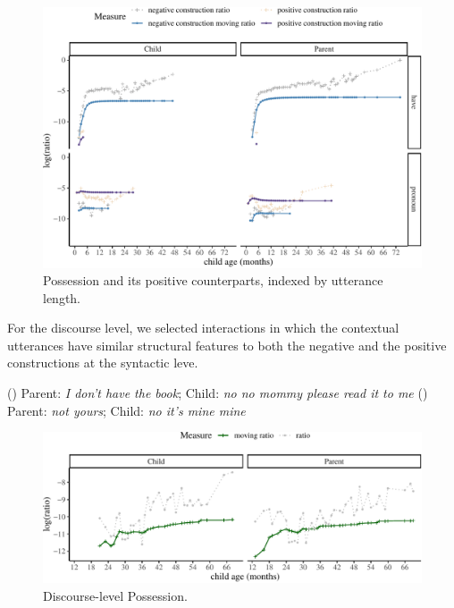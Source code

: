 \documentclass[
  english,
  man,floatsintext]{apa6}
\begin{document}
\begin{figure}[H]

{\centering \includegraphics{neg_construction_article_files/figure-latex/possessionul-1} 

}

\caption{Possession and its positive counterparts, indexed by utterance length.}\label{fig:possessionul}
\end{figure}

For the discourse level, we selected interactions in which the contextual utterances have similar structural features to both the negative and the positive constructions at the syntactic leve.

() Parent: \emph{I don't have the book}; Child: \emph{no no mommy please read it to me}
() Parent: \emph{not yours}; Child: \emph{no it's mine mine}

\begin{figure}[H]

{\centering \includegraphics{neg_construction_article_files/figure-latex/possessiondiscourse-1} 

}

\caption{Discourse-level Possession.}\label{fig:possessiondiscourse}
\end{figure}
\end{document}
